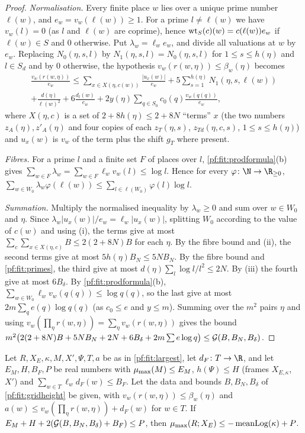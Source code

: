 \begin{proof}
\emph{Normalisation.} Every finite place $w$ lies over a unique prime number $\ell(w)$, and $e_w=v_w(\ell(w))\ge1$. For a
prime $l\ne\ell(w)$ we have $v_w(l)=0$ (as $l$ and $\ell(w)$ are coprime), hence
$\operatorname{wt}_S(c)(w)=c(\ell(w))e_w$ if $\ell(w)\in S$ and $0$ otherwise. Put $\lambda_w=\ell_we_w$, and divide all
valuations at $w$ by $e_w$. Replacing $N_0(\eta,s,l)$ by $N_1(\eta,s,l)=N_0(\eta,s,l)$ for $1\le s\le h(\eta)$ and
$l\in S_d$ and by $0$ otherwise, the hypothesis $v_w(r(w,\eta))\le\beta_w(\eta)$ becomes
\begin{multline*}
\frac{v_w(r(w,\eta))}{e_w}\le\sum_{x\in X(\eta,c(w))}\frac{|u_x(w)|}{e_w}+5\sum_{s=1}^{h(\eta)}N_1(\eta,s,\ell(w))\\
+\frac{d(\eta)}{\ell(w)^2}+6\frac{d_l(w)}{e_w}+2y(\eta)\sum_{q\in S_0}c_0(q)\frac{v_w(q(q))}{e_w},
\end{multline*}
where $X(\eta,c)$ is a set of $2+8h(\eta)\le2+8N$ ``terms'' $x$ (the two numbers $z_A(\eta),z'_A(\eta)$ and four
copies of each $z_T(\eta,s)$, $z_{Td}(\eta,c,s)$, $1\le s\le h(\eta)$) and $u_x(w)$ is $v_w$ of the term plus the
shift $g_T$ where present.

\emph{Fibres.} For a prime $l$ and a finite set $F$ of places over $l$, \cref{pf:fit:prodformula}(b) gives
$\sum_{w\in F}\lambda_w=\sum_{w\in F}\ell_wv_w(l)\le\log l$. Hence for every $\varphi\colon\N\to\R_{\ge0}$,
$\sum_{w\in W_0}\lambda_w\varphi(\ell(w))\le\sum_{l\in\ell(W_0)}\varphi(l)\log l$.

\emph{Summation.} Multiply the normalised inequality by $\lambda_w\ge0$ and sum over $w\in W_0$ and $\eta$. Since
$\lambda_w|u_x(w)|/e_w=\ell_w|u_x(w)|$, splitting $W_0$ according to the value of $c(w)$ and using (i), the terms give
at most $\sum_{c}\sum_{x\in X(\eta,c)}B\le2(2+8N)B$ for each $\eta$. By the fibre bound and (ii), the second terms
give at most $5h(\eta)B_N\le5NB_N$. By the fibre bound and \cref{pf:fit:primes}, the third give at most
$d(\eta)\sum_{l}\log l/l^2\le2N$. By (iii) the fourth give at most $6B_\delta$. By \cref{pf:fit:prodformula}(b),
$\sum_{w\in W_0}\ell_wv_w(q(q))\le\log q(q)$, so the last give at most $2m\sum_qe(q)\log q(q)$ (as $c_0\le e$ and
$y\le m$). Summing over the $m^2$ pairs $\eta$ and using $v_w(\prod_\eta r(w,\eta))=\sum_\eta v_w(r(w,\eta))$ gives
the bound $m^2\bigl(2(2+8N)B+5NB_N+2N+6B_\delta+2m\sum e\log q\bigr)\le\mathcal{G}(B,B_N,B_\delta)$.
\end{proof}

\begin{theorem}\label{pf:fit:passage}
Let $R,X_E,\kappa,M,X',\Psi,T,a$ be as in \cref{pf:fit:largest}, let $d_F\colon T\to\R$, and let $E_M,H,B_F,P$ be real
numbers with $\mu_{\max}(M)\le E_M$, $h(\Psi)\le H$ (frames $X_{E,\kappa}$, $X'$) and $\sum_{w\in T}\ell_wd_F(w)\le B_F$.
Let the data and bounds $B,B_N,B_\delta$ of \cref{pf:fit:gridheight} be given, with $v_w(r(w,\eta))\le\beta_w(\eta)$ and
$a(w)\le v_w(\prod_\eta r(w,\eta))+d_F(w)$ for $w\in T$. If
$E_M+H+2(\mathcal{G}(B,B_N,B_\delta)+B_F)\le P$, then $\mu_{\max}(R;X_E)\le-\operatorname{meanLog}(\kappa)+P$.
\end{theorem}

